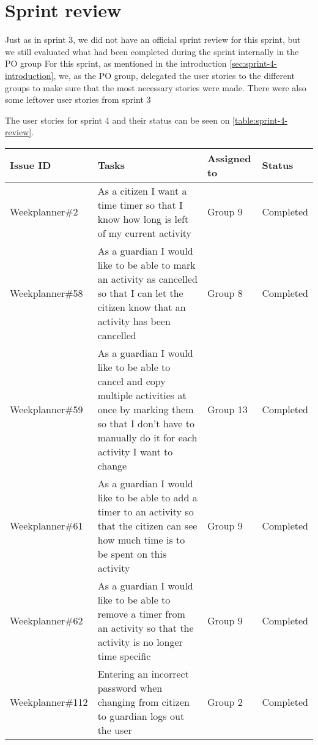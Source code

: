 \section{Sprint review}
Just as in sprint 3, we did not have an official sprint review for this sprint, but we still evaluated what had been completed during the sprint internally in the PO group
For this sprint, as mentioned in the introduction \autoref{sec:sprint-4-introduction}, we, as the PO group, delegated the user stories to the different groups to make sure that the most necessary stories were made. There were also some leftover user stories from sprint 3

The user stories for sprint 4 and their status can be seen on \autoref{table:sprint-4-review}.
\begin{longtable}{|p{2.9cm}|p{8cm}|p{2cm}|p{2cm}|}
    \hline
    Issue ID        & Tasks                                                                                                                                                                                    & Assigned to  & Status   \\ \hline
    Weekplanner\#2 & As a citizen I want a time timer so that I know how long is left of my current activity                                                                                                   & Group 9      & Completed  \\ \hline
    Weekplanner\#58 & As a guardian I would like to be able to mark an activity as cancelled so that I can let the citizen know that an activity has been cancelled                                            & Group 8      & Completed   \\ \hline
    Weekplanner\#59 & As a guardian I would like to be able to cancel and copy multiple activities at once by marking them so that I don't have to manually do it for each activity I want to change           & Group 13     & Completed   \\ \hline
    Weekplanner\#61 & As a guardian I would like to be able to add a timer to an activity so that the citizen can see how much time is to be spent on this activity                                            & Group 9      & Completed    \\ \hline
    Weekplanner\#62 & As a guardian I would like to be able to remove a timer from an activity so that the activity is no longer time specific                                                                 & Group 9      & Completed    \\ \hline
    Weekplanner\#112 & Entering an incorrect password when changing from citizen to guardian logs out the user                                                                                                 & Group 2      & Completed    \\ \hline

\end{longtable}
